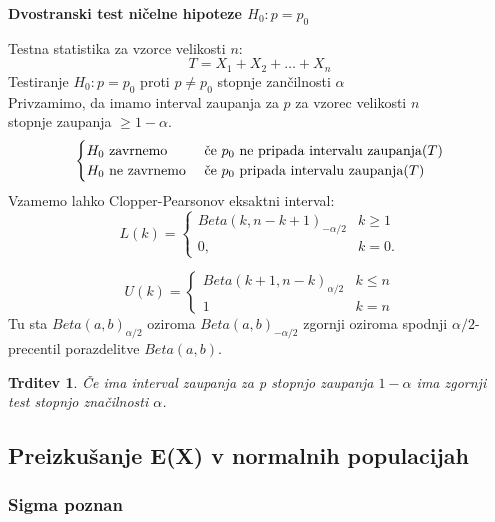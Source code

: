 \documentclass[11pt]{article}
\newtheorem{Trditev}[Izrek]{{\sc Trditev}}
\begin{document}
			\begin{framed}
			\begin{center}
				\textbf{Dvostranski test ničelne hipoteze $H_0: p = p_0$}
			\end{center}
			Testna statistika za vzorce velikosti $n$:
			$$T = X_1 + X_2 +\ldots + X_n$$
			Testiranje $H_0: p= p_0$ proti $p \ne p_0$ stopnje zančilnosti $\alpha$
			\\
			Privzamimo, da imamo interval zaupanja za $p$ za vzorec velikosti $n$ 
			\\ stopnje zaupanja $\ge 1-\alpha$.
			\[
			\begin{cases}
			H_0 \textnormal{ zavrnemo } & \textnormal{če $p_0$ ne pripada intervalu zaupanja}(T)\\
			H_0 \textnormal{ ne zavrnemo } & \textnormal{če $p_0$ pripada intervalu zaupanja}(T)
			\end{cases}
			\]
			Vzamemo lahko Clopper-Pearsonov eksaktni interval:
			\[
			L(k)= 
			\begin{cases}
			Beta(k, n-k+1)_{-\alpha/2} & k\ge 1\\
			0,              & k = 0.
			\end{cases}
			\]
			
			\[
			U(k)= 
			\begin{cases}
			Beta(k+1, n-k)_{\alpha/2}& k\le n\\
			1             & k=n
			\end{cases}
			\]
			Tu sta $Beta(a,b)_{\alpha/2}$ oziroma $Beta(a,b)_{-\alpha/2}$ zgornji oziroma spodnji $\alpha/2$-precentil porazdelitve $Beta(a,b)$.
			\end{framed}
		\begin{Trditev}
			Če ima interval zaupanja za p stopnjo zaupanja $1-\alpha$ ima zgornji test stopnjo značilnosti $\alpha$.
		\end{Trditev}
\subsection{Preizkušanje E(X) v normalnih populacijah}
	\subsubsection{Sigma poznan}
	
\end{document}
